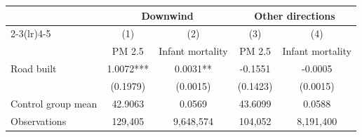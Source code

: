 {
\def\sym#1{\ifmmode^{#1}\else\(^{#1}\)\fi}
\begin{tabular}{l*{4}{c}}
\hline\hline
                         &\multicolumn{2}{c}{Downwind}   &\multicolumn{2}{c}{Other directions}\\\cmidrule(lr){2-3}\cmidrule(lr){4-5}
                         &\multicolumn{1}{c}{(1)}&\multicolumn{1}{c}{(2)}&\multicolumn{1}{c}{(3)}&\multicolumn{1}{c}{(4)}\\
                         &\multicolumn{1}{c}{PM 2.5}&\multicolumn{1}{c}{Infant mortality}&\multicolumn{1}{c}{PM 2.5}&\multicolumn{1}{c}{Infant mortality}\\
\hline
Road built               &      1.0072***&      0.0031** &     -0.1551   &     -0.0005   \\
                         &    (0.1979)   &    (0.0015)   &    (0.1423)   &    (0.0015)   \\
\hline
Control group mean       &     42.9063   &      0.0569   &     43.6099   &      0.0588   \\
Observations             &     129,405   &   9,648,574   &     104,052   &   8,191,400   \\
\hline\hline
\end{tabular}
}
